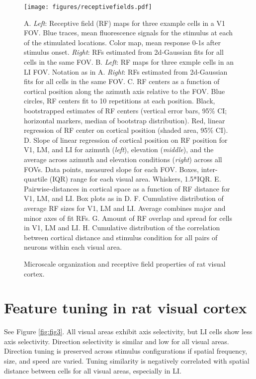 \documentclass{article}
\begin{document}
\begin{figure}[ht]
  \texttt{[image: figures/receptivefields.pdf]}
  \caption{Microscale organization and receptive field properties of rat visual cortex.}
  \medskip
  \small
  A.  \textit{Left}:  Receptive field (RF) maps for three example cells in a V1 FOV. Blue traces, mean fluorescence signals for the stimulus at each of the stimulated locations. Color map, mean response 0-1s after stimulus onset.  \textit{Right}:  RFs estimated from 2d-Gaussian fits for all cells in the same FOV. 
  B.  \textit{Left}:  RF maps for three exmple cells in an LI FOV. Notation as in A. \textit{Right}:  RFs estimated from 2d-Gaussian fits for all cells in the same FOV.
  C.  RF centers as a function of cortical position along the azimuth axis relative to the FOV. Blue circles, RF centers fit to 10 repetitions at each position. Black, bootstrapped estimates of RF centers (vertical error bars, 95\% CI; horizontal markers, median of bootstrap distribution). Red, linear regression of RF center on cortical position (shaded area, 95\% CI).
  D.  Slope of linear regression of cortical position on RF position for V1, LM, and LI for azimuth (\textit{left}), elevation (\textit{middle}), and the average across azimuth and elevation conditions (\textit{right}) across all FOVs. Data points, measured slope for each FOV.  Boxes, inter-quartile (IQR) range for each visual area. Whiskers, 1.5*IQR.
  E.  Pairwise-distances in cortical space as a function of RF distance for V1, LM, and LI. Box plots as in D. 
  F.  Cumulative distribution of average RF sizes for V1, LM and LI. Average combines major and minor axes of fit RFs. 
  G.  Amount of RF overlap  and spread for cells in V1, LM and LI.  
  H.  Cumulative distribution of the correlation between cortical distance and stimulus condition for all pairs of neurons within each visual area. 

  \label{fig:fig2}
\end{figure}

\section{Feature tuning in rat visual cortex}
See Figure \ref{fig:fig3}. All visual areas exhibit axis selectivity, but LI cells show less axis selectivity. Direction selectivity is similar and low for all visual areas. Direction tuning is preserved across stimulus configurations if spatial frequency, size, and speed are varied. Tuning similarity is negatively correlated with spatial distance between cells for all visual areas, especially in LI. 
\end{document}
